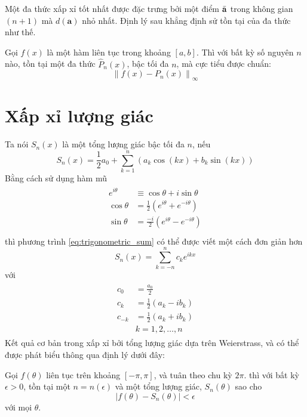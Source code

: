 Một đa thức xấp xỉ tốt nhất được đặc trưng bởi một điểm $\Bar{\mathbf{a}}$ trong không gian $(n+1)$ mà $d(\mathbf{a})$ nhỏ nhất. Định lý sau khẳng định sử tồn tại của đa thức như thế.
\begin{theorem}
    Gọi $f(x)$ là một hàm liên tục trong khoảng $[a,b]$. Thì với bất kỳ số nguyên $n$ nào, tồn tại một đa thức $\hat{P}_n(x)$, bậc tối đa $n$, mà cực tiểu được chuẩn:
    \begin{equation}
        \left \| f(x) - P_n(x) \right \|_{\infty}
    \end{equation}
\end{theorem}

\section{Xấp xỉ lượng giác}

Ta nói $S_n(x)$ là một tổng lượng giác bậc tối đa $n$, nếu
\begin{equation}
    \label{eq:trigonometric_sum}
    S_n(x) = \frac{1}{2}a_0 + \sum_{k=1}^n(a_k\cos(kx) + b_k\sin(kx))
\end{equation}
Bằng cách sử dụng hàm mũ
\begin{align}
    \begin{aligned}
        e^{i\theta} &\equiv \cos\theta + i\sin\theta\\
        \cos\theta &= \frac{1}{2}(e^{i\theta} + e^{-i\theta})\\
        \sin\theta &= \frac{-i}{2}(e^{i\theta} - e^{-i\theta})\\
    \end{aligned}
\end{align}
thì phương trình \eqref{eq:trigonometric_sum} có thể được viết một cách đơn giản hơn
\begin{equation}
    S_n(x) = \sum_{k=-n}^nc_ke^{ikx}
\end{equation}
với 
\begin{align}
    \begin{aligned}
        c_0 &= \frac{a_0}{2}\\
        c_k &= \frac{1}{2}(a_k - ib_k)\\
        c_{-k} &=  \frac{1}{2}(a_k + ib_k)\\
        & k = 1, 2, \dots, n
    \end{aligned}
\end{align}
Kết quả cơ bản trong xấp xỉ bởi tổng lượng giác dựa trên Weierstrass, và có thể được phát biểu thông qua định lý dưới đây:
\begin{theorem}
    Gọi $f(\theta)$ liên tục trên khoảng $[-\pi, \pi]$, và tuân theo chu kỳ $2\pi$. thì với bất kỳ $\epsilon > 0$, tồn tại một $n = n(\epsilon)$ và một tổng lượng giác, $S_n(\theta)$ sao cho
    \begin{equation}
        \left | f(\theta) - S_n(\theta) \right | < \epsilon
    \end{equation}
    với mọi $\theta$.
\end{theorem}


